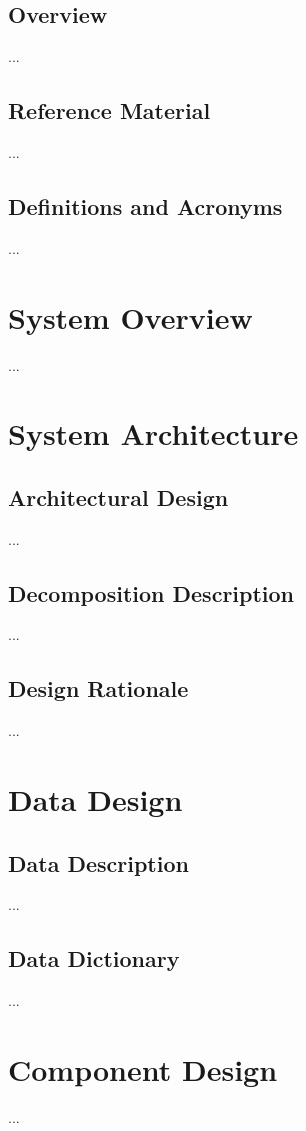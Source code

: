\documentclass[]{article}
\begin{document}
\subsection{Overview}
...



\subsection{Reference Material}
... 


\subsection{Definitions and Acronyms}
...

\section{System Overview}
...

\section{System Architecture}
\subsection{Architectural Design}
...


\subsection{Decomposition Description}
...


\subsection{Design Rationale}
...


\section{Data Design}
\subsection{Data Description}
...

\subsection {Data Dictionary}
...

\section{Component Design}
...
\end{document}
